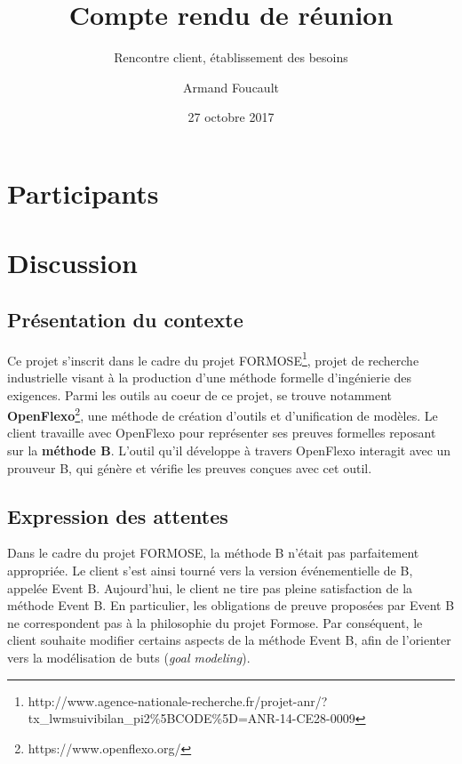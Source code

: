 \documentclass{article}
\author{Armand Foucault}
\date{27 octobre 2017}
\title{Compte rendu de réunion}
\subtitle{Rencontre client, établissement des besoins}
\begin{document}
\imtammMaketitle

\section*{Participants}

\begin{imtammActorList}
\item \actorjcbach
\item \actorabeugnard
\item \actorasavary
\item \actorafoucaul
\end{imtammActorList}


\section*{Discussion}

\subsection*{Présentation du contexte}

Ce projet s'inscrit dans le cadre du projet FORMOSE\footnote{%
http://www.agence-nationale-recherche.fr/projet-anr/?tx\_lwmsuivibilan\_pi2\%5BCODE\%5D=ANR-14-CE28-0009}, %
projet de recherche industrielle visant à la production d'une méthode formelle d'ingénierie des exigences.
Parmi les outils au coeur de ce projet, se trouve notamment \textbf{OpenFlexo}\footnote{%
https://www.openflexo.org/}, une méthode de création d'outils et d'unification de modèles.
Le client travaille avec OpenFlexo pour représenter ses preuves formelles reposant sur la \textbf{méthode B}.
L'outil qu'il développe à travers OpenFlexo interagit avec un prouveur B, qui génère et vérifie les preuves conçues avec cet outil.

\subsection*{Expression des attentes}

Dans le cadre du projet FORMOSE, la méthode B n'était pas parfaitement appropriée.
Le client s'est ainsi tourné vers la version événementielle de B, appelée Event B.
Aujourd'hui, le client ne tire pas pleine satisfaction de la méthode Event B.
En particulier, les obligations de preuve proposées par Event B ne correspondent pas à la philosophie du projet Formose.
Par conséquent, le client souhaite modifier certains aspects de la méthode Event B, afin de l'orienter vers la modélisation de buts (\textit{goal modeling}).
\end{document}
